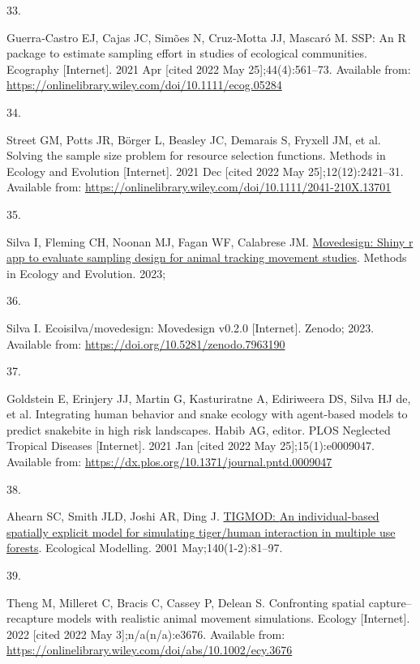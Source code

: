 \documentclass[10pt,a4paper]{article}
\newlength{\cslhangindent}
\newlength{\csllabelwidth}
\newenvironment{CSLReferences}[2] %
{\begin{list}{}{%
	\setlength{\itemindent}{0pt}
	\setlength{\leftmargin}{0pt}
	\setlength{\parsep}{0pt}
	\ifodd #1
	\setlength{\leftmargin}{\cslhangindent}
	\setlength{\itemindent}{-1\cslhangindent}
	\fi
	\setlength{\itemsep}{#2\baselineskip}}}
{\end{list}}
\newcommand{\CSLLeftMargin}[1]{\parbox[t]{\csllabelwidth}{\strut#1\strut}}
\newcommand{\CSLRightInline}[1]{\parbox[t]{\linewidth - \csllabelwidth}{\strut#1\strut}}
\begin{document}
\begin{CSLReferences}{0}{1}
\CSLLeftMargin{33. }%
\CSLRightInline{Guerra‐Castro EJ, Cajas JC, Simões N, Cruz‐Motta JJ, Mascaró M. {SSP}: An {R} package to estimate sampling effort in studies of ecological communities. Ecography {[}Internet{]}. 2021 Apr {[}cited 2022 May 25{]};44(4):561--73. Available from: \url{https://onlinelibrary.wiley.com/doi/10.1111/ecog.05284}}

\CSLLeftMargin{34. }%
\CSLRightInline{Street GM, Potts JR, Börger L, Beasley JC, Demarais S, Fryxell JM, et al. Solving the sample size problem for resource selection functions. Methods in Ecology and Evolution {[}Internet{]}. 2021 Dec {[}cited 2022 May 25{]};12(12):2421--31. Available from: \url{https://onlinelibrary.wiley.com/doi/10.1111/2041-210X.13701}}

\CSLLeftMargin{35. }%
\CSLRightInline{Silva I, Fleming CH, Noonan MJ, Fagan WF, Calabrese JM. \href{https://doi.org/10.1111/2041-210X.14153}{Movedesign: Shiny r app to evaluate sampling design for animal tracking movement studies}. Methods in Ecology and Evolution. 2023; }

\CSLLeftMargin{36. }%
\CSLRightInline{Silva I. Ecoisilva/movedesign: Movedesign v0.2.0 {[}Internet{]}. Zenodo; 2023. Available from: \url{https://doi.org/10.5281/zenodo.7963190}}

\CSLLeftMargin{37. }%
\CSLRightInline{Goldstein E, Erinjery JJ, Martin G, Kasturiratne A, Ediriweera DS, Silva HJ de, et al. Integrating human behavior and snake ecology with agent-based models to predict snakebite in high risk landscapes. Habib AG, editor. PLOS Neglected Tropical Diseases {[}Internet{]}. 2021 Jan {[}cited 2022 May 25{]};15(1):e0009047. Available from: \url{https://dx.plos.org/10.1371/journal.pntd.0009047}}

\CSLLeftMargin{38. }%
\CSLRightInline{Ahearn SC, Smith JLD, Joshi AR, Ding J. \href{https://doi.org/10.1016/S0304-3800(01)00258-7}{{TIGMOD}: {An} individual-based spatially explicit model for simulating tiger/human interaction in multiple use forests}. Ecological Modelling. 2001 May;140(1-2):81--97. }

\CSLLeftMargin{39. }%
\CSLRightInline{Theng M, Milleret C, Bracis C, Cassey P, Delean S. Confronting spatial capture--recapture models with realistic animal movement simulations. Ecology {[}Internet{]}. 2022 {[}cited 2022 May 3{]};n/a(n/a):e3676. Available from: \url{https://onlinelibrary.wiley.com/doi/abs/10.1002/ecy.3676}}


\end{CSLReferences}
\end{document}

